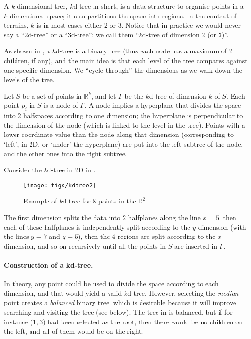 A $k$-dimensional tree, $k$d-tree in short, is a data structure to organise points in a $k$-dimensional space; it also partitions the space into regions.
In the context of terrains, $k$ is in most cases either 2 or 3.
Notice that in practice we would never say a ``2d-tree'' or a ``3d-tree'': we call them ``$k$d-tree of dimension 2 (or 3)''.

%

As shown in , a $k$d-tree is a binary tree%
(thus each node has a maximum of 2 children, if any), and the main idea is that each level of the tree compares against one specific dimension.
We ``cycle through'' the dimensions as we walk down the levels of the tree.

%

Let $S$ be a set of points in $\mathbb{R}^k$, and let $\Gamma$ be the $k$d-tree of dimension $k$ of $S$.
Each point $p_i$ in $S$ is a node of $\Gamma$.
A node implies a hyperplane%
that divides the space into 2 halfspaces according to one dimension; the hyperplane is perpendicular to the dimension of the node (which is linked to the level in the tree).
Points with a lower coordinate value than the node along that dimension (corresponding to `left', in 2D, or `under' the hyperplane) are put into the left subtree of the node, and the other ones into the right subtree.

Consider the $k$d-tree in 2D in .
\begin{figure}[tbp]
  \centering
  \texttt{[image: figs/kdtree2]}
  \caption{Example of $k$d-tree for 8 points in the $\mathbb{R}^2$.}%
\end{figure}
The first dimension splits the data into 2 halfplanes along the line $x=5$, then each of these halfplanes is independently split according to the $y$ dimension (with the lines $y=7$ and $y=5$), then the 4 regions are split according to the $x$ dimension, and so on recursively until all the points in $S$ are inserted in $\Gamma$.

\paragraph{Construction of a kd-tree.}
In theory, any point could be used to divide the space according to each dimension, and that would yield a valid $k$d-tree.
However, selecting the \emph{median} point creates a \emph{balanced} binary tree,%
which is desirable because it will improve searching and visiting the tree (see below).
The tree in  is balanced, but if for instance ($1,3$) had been selected as the root, then there would be no children on the left, and all of them would be on the right.

